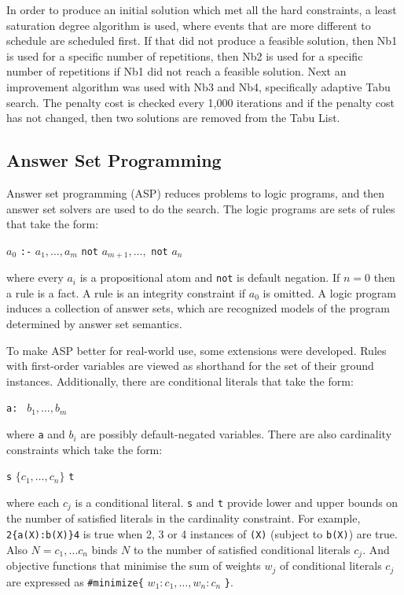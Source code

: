 \documentclass[a4paper, 12pt]{report}
\begin{document}
In order to produce an initial solution which met all the hard constraints, a
least saturation degree algorithm is used, where events that are more different
to schedule are scheduled first.
If that did not produce a feasible solution, then Nb1 is used for a specific
number of repetitions, then Nb2 is used for a specific number of repetitions if
Nb1 did not reach a feasible solution.
Next an improvement algorithm was used with Nb3 and Nb4, specifically adaptive
Tabu search.
The penalty cost is checked every 1,000 iterations and if the penalty cost has
not changed, then two solutions are removed from the Tabu List.

\subsection{Answer Set Programming}
Answer set programming (ASP) reduces problems to logic programs, and then
answer set solvers are used to do the search. The logic programs are sets of
rules that take the form:
\begin{center}
	\( a_0 \) \verb|:-| \( a_1, \ldots, a_m \) \verb|not| \( a_{m+1}, \ldots, \)
	\verb|not| \( a_n \)
\end{center}
where every \( a_i \) is a propositional atom and \verb|not| is default 
negation.
If \( n = 0 \) then a rule is a fact. A rule is an integrity constraint if
\( a_0 \) is omitted.
A logic program induces a collection of answer sets, which are recognized models
of the program determined by answer set semantics.

To make ASP better for real-world use, some extensions were developed.
Rules with first-order variables are viewed as shorthand for the set of their
ground instances.
Additionally, there are conditional literals that take the form:
\begin{center}
	\verb|a: | \( b_1, \ldots, b_m \)
\end{center}
where \verb|a| and \( b_i \) are possibly default-negated variables.
There are also cardinality constraints which take the form:
\begin{center}
	\verb|s| \( \{c_1, \ldots, c_n\} \) \verb|t|
\end{center}
where each \( c_j \) is a conditional literal.
\verb|s| and \verb|t| provide lower and upper bounds on the number of satisfied
literals in the cardinality constraint.
For example, \verb|2{a(X):b(X)}4| is true when 2, 3 or 4 instances of \verb|(X)|
(subject to \verb|b(X)|) are true. 
Also \( N=c_1,\ldots c_n \) binds \( N \) to the number of satisfied conditional
literals \( c_j \).
And objective functions that minimise the sum of weights \( w_j \) of
conditional literals \( c_j \) are expressed as \verb|#minimize{| \( w_1:c_1,
\ldots, w_n:c_n \) \verb|}|.
\end{document}

